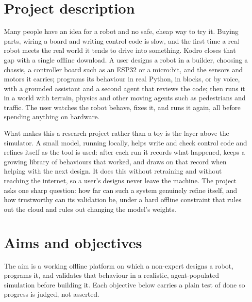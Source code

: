 \documentclass[10.5pt]{article}
\begin{document}
\section{Project description}
Many people have an idea for a robot and no safe, cheap way to try it. Buying parts, wiring a board and writing control code is slow, and the first time a real robot meets the real world it tends to drive into something. Kodro closes that gap with a single offline download. A user designs a robot in a builder, choosing a chassis, a controller board such as an ESP32 or a micro:bit, and the sensors and motors it carries; programs its behaviour in real Python, in blocks, or by voice, with a grounded assistant and a second agent that reviews the code; then runs it in a world with terrain, physics and other moving agents such as pedestrians and traffic. The user watches the robot behave, fixes it, and runs it again, all before spending anything on hardware.

What makes this a research project rather than a toy is the layer above the simulator. A small model, running locally, helps write and check control code and refines itself as the tool is used: after each run it records what happened, keeps a growing library of behaviours that worked, and draws on that record when helping with the next design. It does this without retraining and without reaching the internet, so a user's designs never leave the machine. The project asks one sharp question: how far can such a system genuinely refine itself, and how trustworthy can its validation be, under a hard offline constraint that rules out the cloud and rules out changing the model's weights.

\section{Aims and objectives}
The aim is a working offline platform on which a non-expert designs a robot, programs it, and validates that behaviour in a realistic, agent-populated simulation before building it. Each objective below carries a plain test of done so progress is judged, not asserted.
\end{document}
